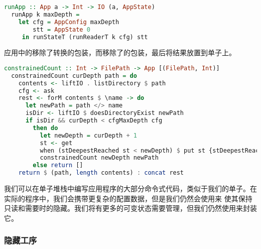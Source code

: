 \documentclass[./main.tex]{subfiles}
\begin{document}
\begin{lstlisting}[language=Haskell]
  runApp :: App a -> Int -> IO (a, AppState)
  runApp k maxDepth =
    let cfg = AppConfig maxDepth
        stt = AppState 0
     in runStateT (runReaderT k cfg) stt
\end{lstlisting}

应用中的移除了转换的包装，而移除了的包装，最后将结果放置到单子上。

\begin{lstlisting}[language=Haskell]
  constrainedCount :: Int -> FilePath -> App [(FilePath, Int)]
  constrainedCount curDepth path = do
    contents <- liftIO . listDirectory $ path
    cfg <- ask
    rest <- forM contents $ \name -> do
      let newPath = path </> name
      isDir <- liftIO $ doesDirectoryExist newPath
      if isDir && curDepth < cfgMaxDepth cfg
        then do
          let newDepth = curDepth + 1
          st <- get
          when (stDeepestReached st < newDepth) $ put st {stDeepestReached = newDepth}
          constrainedCount newDepth newPath
        else return []
    return $ (path, length contents) : concat rest
\end{lstlisting}

我们可以在单子堆栈中编写应用程序的大部分命令式代码，类似于我们的单子。在实际的程序中，我们会携带更复杂的配置数据，但是我们仍然会使用来
使其保持只读和需要时的隐藏。我们将有更多的可变状态需要管理，但我们仍然使用来封装它。

\subsubsection*{隐藏工序}

%

\begin{lstlisting}[language=Haskell]

\end{lstlisting}



\begin{lstlisting}[language=Haskell]

\end{lstlisting}



\begin{lstlisting}[language=Haskell]

\end{lstlisting}
\end{document}
